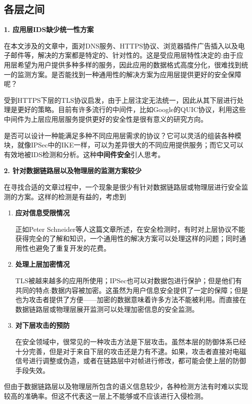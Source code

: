 \documentclass[12pt]{article} %
\begin{document}
\subsection{各层之间}
\label{layer}

\textbf{1. 应用层IDS缺少统一性方案}

在本文涉及的文章中，面对DNS服务、HTTPS协议、浏览器插件广告插入以及电子邮件等，解决的方案都是特定的、针对性的。这是受应用层特性决定的:由于应用层希望为用户提供多种多样的服务，因此应用的数据格式高度分化，很难找到统一的监测方案。是否能找到一种通用性的解决方案为应用层提供更好的安全保障呢？

受到HTTPS下层的TLS协议启发，由于上层注定无法统一，因此从其下层进行处理是更好的策略。目前有许多流行的中间件，比如Google的QUIC协议，利用这些中间件为上层应用层服务提供更好的安全性是很有意义的研究方向。

是否可以设计一种能满足多种不同应用层需求的协议？它可以灵活的组装各种模块，就像IPSec中的IKE一样，可以为差异很大的不同应用提供服务；而它又可以有效地被IDS检测和分析。这种\textbf{中间件安全}引人思考。

\textbf{2. 针对数据链路层以及物理层的监测方案较少}

在寻找合适的文章过程中，一个现象是很少有针对数据链路层或物理层进行安全监测的方案。这样的检测是有益的，考虑到

\begin{enumerate}
    \item \textbf{应对信息受限情况}

    正如Peter Schneider等人这篇文章所述，在安全检测时，有时对上层协议不能获得完全的了解和知识，一个通用性的解决方案可以处理这样的问题；同时通用性也避免了重复开发的花费。

    \item \textbf{处理上层加密情况}

    TLS被越来越多的应用所使用；IPSec也可以对数据包进行保护；但是他们有共同的特点:数据内容被加密。这虽然为用户信息安全提供了一定的保障；但是也为攻击者提供了方便——加密的数据意味着许多方法不能被利用。而直接在数据链路层或物理层展开监测可以处理加密信息的安全监测。

    \item \textbf{对下层攻击的预防}

    在安全领域中，很常见的一种攻击方法是下层攻击。虽然本层的防御体系已经十分完善，但是对于来自下层的攻击还是力有不逮。如果，攻击者直接对电磁信号进行调整或伪造，或者在链路层中对帧进行修改，都可能会使上层的防御手段失效。
\end{enumerate}

但由于数据链路层以及物理层所包含的语义信息较少，各种检测方法有时难以实现较高的准确率。但这不代表这一层上不能够或不应该进行入侵检测。
\end{document}
